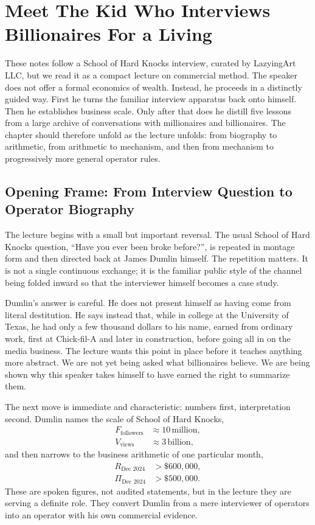 \chapter{Meet The Kid Who Interviews Billionaires For a Living}

These notes follow a School of Hard Knocks interview, curated by LazyingArt LLC, but we read it as a compact lecture on commercial method. The speaker does not offer a formal economics of wealth. Instead, he proceeds in a distinctly guided way. First he turns the familiar interview apparatus back onto himself. Then he establishes business scale. Only after that does he distill five lessons from a large archive of conversations with millionaires and billionaires. The chapter should therefore unfold as the lecture unfolds: from biography to arithmetic, from arithmetic to mechanism, and then from mechanism to progressively more general operator rules.

\section{Opening Frame: From Interview Question to Operator Biography}

The lecture begins with a small but important reversal. The usual School of Hard Knocks question, ``Have you ever been broke before?'', is repeated in montage form and then directed back at James Dumlin himself. The repetition matters. It is not a single continuous exchange; it is the familiar public style of the channel being folded inward so that the interviewer himself becomes a case study.

Dumlin's answer is careful. He does not present himself as having come from literal destitution. He says instead that, while in college at the University of Texas, he had only a few thousand dollars to his name, earned from ordinary work, first at Chick-fil-A and later in construction, before going all in on the media business. The lecture wants this point in place before it teaches anything more abstract. We are not yet being asked what billionaires believe. We are being shown why this speaker takes himself to have earned the right to summarize them.

The next move is immediate and characteristic: numbers first, interpretation second. Dumlin names the scale of School of Hard Knocks,
\begin{align}
F_{\text{followers}} &\approx 10\,\text{million}, \\
V_{\text{views}} &\approx 3\,\text{billion},
\end{align}
and then narrows to the business arithmetic of one particular month,
\begin{align}
R_{\text{Dec 2024}} &> \$600{,}000, \\
\Pi_{\text{Dec 2024}} &> \$500{,}000.
\end{align}
These are spoken figures, not audited statements, but in the lecture they are serving a definite role. They convert Dumlin from a mere interviewer of operators into an operator with his own commercial evidence.

